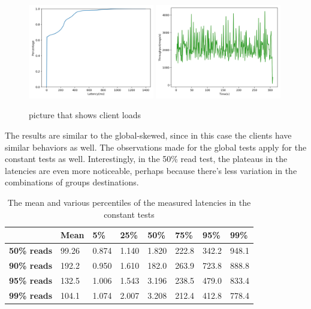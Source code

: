 \begin{figure}[!htb]
  \centering
  \includegraphics[width=0.49\textwidth,height=\textheight,keepaspectratio]{img/constant1_lat.png}
  \includegraphics[width=0.49\textwidth,height=\textheight,keepaspectratio]{img/constant1_tp.png}
  \caption{ picture that shows client loads }
  \label{fig:constant1-performance}
\end{figure}

The results are similar to the global-skewed, since in this case the clients have similar behaviors as well. The observations made for the global tests apply for the constant tests as well. Interestingly, in the 50\% read test, the plateaus in the latencies are even more noticeable, perhaps because there's less variation in the combinations of groups destinations.

\begin{table}[!htb]
  \centering
  \begin{tabular}{l l l l l l l l}
    \hline
    & \textbf{Mean} & \textbf{5\%} & \textbf{25\%} & \textbf{50\%} & \textbf{75\%} & \textbf{95\%}& \textbf{99\%} \\
    \hline
    \textbf{50\% reads} & 99.26 & 0.874 & 1.140 & 1.820 & 222.8 & 342.2 & 948.1 \\
    \textbf{90\% reads} & 192.2 & 0.950 & 1.610 & 182.0 & 263.9 & 723.8 & 888.8 \\
    \textbf{95\% reads} & 132.5 & 1.006 & 1.543 & 3.196 & 238.5 & 479.0 & 833.4 \\
    \textbf{99\% reads} & 104.1 & 1.074 & 2.007 & 3.208 & 212.4 & 412.8 & 778.4 \\
    \hline
  \end{tabular}
  \caption{The mean and various percentiles of the measured latencies in the constant tests}\label{tab:constant-latencies-table}
\end{table}

